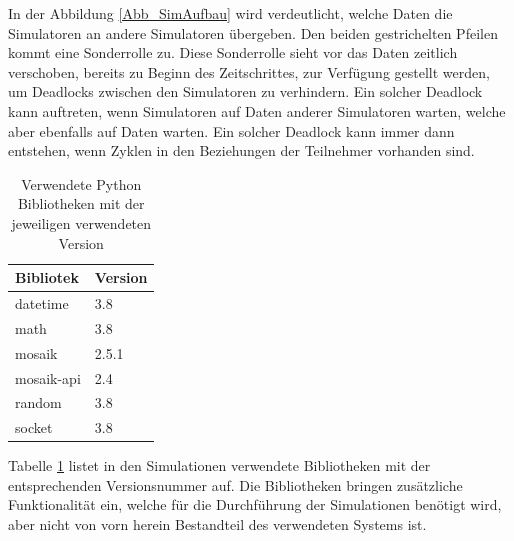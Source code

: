 In der Abbildung \ref{Abb_SimAufbau} wird verdeutlicht, welche Daten die Simulatoren an andere Simulatoren übergeben. Den beiden gestrichelten Pfeilen kommt eine Sonderrolle zu. Diese Sonderrolle sieht vor das Daten zeitlich verschoben, bereits zu Beginn des Zeitschrittes, zur Verfügung gestellt werden, um Deadlocks zwischen den Simulatoren zu verhindern. Ein solcher Deadlock kann auftreten, wenn Simulatoren auf Daten anderer Simulatoren warten, welche aber ebenfalls auf Daten warten. Ein solcher Deadlock kann immer dann entstehen, wenn Zyklen in den Beziehungen der Teilnehmer vorhanden sind. \\
\begin{table}[tbh]
\centering
\begin{tabular}{|l|l|}
\hline
Bibliotek           & Version    \\ \hline \hline
datetime            & 3.8        \\ \hline
math                & 3.8        \\ \hline
mosaik              & 2.5.1      \\ \hline
mosaik-api          & 2.4        \\ \hline
random              & 3.8        \\ \hline
socket              & 3.8        \\ \hline
\end{tabular}
\caption{Verwendete Python Bibliotheken mit der jeweiligen verwendeten Version}
\label{tab:my-tableLib}
\end{table}

Tabelle \ref{tab:my-tableLib} listet in den Simulationen verwendete Bibliotheken mit der entsprechenden Versionsnummer auf. Die Bibliotheken bringen zusätzliche Funktionalität ein, welche für die Durchführung der Simulationen benötigt wird, aber nicht von vorn herein Bestandteil des verwendeten Systems ist.  

